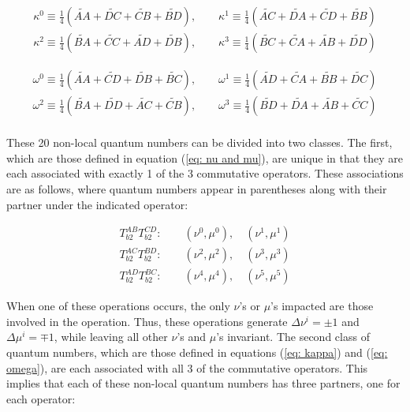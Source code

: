 \documentclass{article}
\begin{document}
\begin{equation}
\begin{array}{cc}
     \kappa^{0}\equiv\frac{1}{4}( \widetilde{AA}+\widetilde{DC}+\widetilde{CB}+\widetilde{BD}), 
     \qquad \kappa^{1}\equiv\frac{1}{4}( \widetilde{AC}+\widetilde{DA}+\widetilde{CD}+\widetilde{BB})\\
     \kappa^{2}\equiv\frac{1}{4}( \widetilde{BA}+\widetilde{CC}+\widetilde{AD}+\widetilde{DB}), 
     \qquad \kappa^3\equiv\frac{1}{4}( \widetilde{BC}+\widetilde{CA}+\widetilde{AB}+\widetilde{DD})
\end{array}
\label{eq: kappa}
\end{equation}

\begin{equation}
\begin{array}{cc}
     \omega^0\equiv\frac{1}{4}( \widetilde{AA}+\widetilde{CD}+\widetilde{DB}+\widetilde{BC}), 
     \qquad \omega^1\equiv\frac{1}{4}( \widetilde{AD}+\widetilde{CA}+\widetilde{BB}+\widetilde{DC})\\
     \omega^2\equiv\frac{1}{4}( \widetilde{BA}+\widetilde{DD}+\widetilde{AC}+\widetilde{CB}), 
     \qquad \omega^3\equiv\frac{1}{4}( \widetilde{BD}+\widetilde{DA}+\widetilde{AB}+\widetilde{CC})\\
\end{array}
\label{eq: omega}
\end{equation}

These 20 non-local quantum numbers can be divided into two classes. The first, which are those defined in equation (\ref{eq: nu and mu}), are unique in that they are each associated with exactly 1 of the 3 commutative operators. These associations are as follows, where quantum numbers appear in parentheses along with their partner under the indicated operator:

\begin{equation}
\begin{array}{cc}
    T^{AB}_{b2}T^{CD}_{b2}: \qquad (\nu^0, \mu^0), \quad (\nu^1, \mu^1)\\
    T^{AC}_{b2}T^{BD}_{b2}: \qquad (\nu^2, \mu^2), \quad (\nu^3, \mu^3)\\
    T^{AD}_{b2}T^{BC}_{b2}: \qquad (\nu^4, \mu^4), \quad (\nu^5, \mu^5)
    \label{eq: nu mu operations}
\end{array}
\end{equation}

When one of these operations occurs, the only $\nu$'s or $\mu$'s impacted are those involved in the operation. Thus, these operations generate $\Delta\nu^i=\pm1$ and $\Delta\mu^i=\mp1$, while leaving all other $\nu$'s and $\mu$'s invariant. The second class of quantum numbers, which are those defined in equations (\ref{eq: kappa}) and (\ref{eq: omega}), are each associated with all 3 of the commutative operators. This implies that each of these non-local quantum numbers has three partners, one for each operator:
\end{document}
